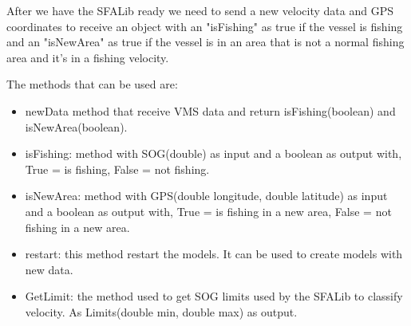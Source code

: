 After we have the SFALib ready we need to send a new velocity data and GPS coordinates to receive an object with an "isFishing" as true if the vessel is fishing and an "isNewArea" as true if the vessel is in an area that is not a normal fishing area and it's in a fishing velocity.

The methods that can be used are:
\begin{itemize}
\item newData method that receive VMS data and return isFishing(boolean) and isNewArea(boolean).
\item isFishing: method with SOG(double) as input and a boolean as output with, True = is fishing, False = not fishing.
\item isNewArea: method with GPS(double longitude, double latitude) as input and a boolean as output with, True = is fishing in a new area, False = not fishing in a new area.
\item restart: this method restart the models. It can be used to create models with new data.
\item GetLimit: the method used to get SOG limits used by the SFALib to classify velocity. As Limits(double min, double max) as output.
\end{itemize}






